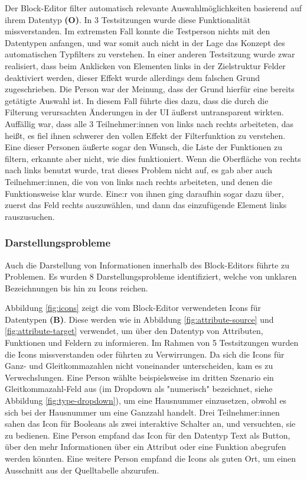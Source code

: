 Der Block-Editor filter automatisch relevante Auswahlmöglichkeiten basierend auf ihrem Datentyp \textbf{(O)}. In 3 Testsitzungen wurde diese Funktionalität missverstanden. Im extremsten Fall konnte die Testperson nichts mit den Datentypen anfangen, und war somit auch nicht in der Lage das Konzept des automatischen Typfilters zu verstehen. In einer anderen Testsitzung wurde zwar realisiert, dass beim Anklicken von Elementen links in der Zielstruktur Felder deaktiviert werden, dieser Effekt wurde allerdings dem falschen Grund zugeschrieben. Die Person war der Meinung, dass der Grund hierfür eine bereits getätigte Auswahl ist. In diesem Fall führte dies dazu, dass die durch die Filterung verursachten Änderungen in der UI äußerst untransparent wirkten. Auffällig war, dass alle 3 Teilnehmer:innen von links nach rechts arbeiteten, das heißt, es fiel ihnen schwerer den vollen Effekt der Filterfunktion zu verstehen. Eine dieser Personen äußerte sogar den Wunsch, die Liste der Funktionen zu filtern, erkannte aber nicht, wie dies funktioniert. Wenn die Oberfläche von rechts nach links benutzt wurde, trat dieses Problem nicht auf, es gab aber auch Teilnehmer:innen, die von von links nach rechts arbeiteten, und denen die Funktionsweise klar wurde. Eine:r von ihnen ging daraufhin sogar dazu über, zuerst das Feld rechts auszuwählen, und dann das einzufügende Element links rauszusuchen.

\subsubsection{Darstellungsprobleme}

Auch die Darstellung von Informationen innerhalb des Block-Editors führte zu Problemen. Es wurden 8 Darstellungsprobleme identifiziert, welche von unklaren Bezeichnungen bis hin zu Icons reichen.

Abbildung \ref{fig:icons} zeigt die vom Block-Editor verwendeten Icons für Datentypen \textbf{(B)}. Diese werden wie in Abbildung \ref{fig:attribute-source} und \ref{fig:attribute-target} verwendet, um über den Datentyp von Attributen, Funktionen und Feldern zu informieren. Im Rahmen von 5 Testsitzungen wurden die Icons missverstanden oder führten zu Verwirrungen. Da sich die Icons für Ganz- und Gleitkommazahlen nicht voneinander unterscheiden, kam es zu Verwechslungen. Eine Person wählte beispielsweise im dritten Szenario ein Gleitkommazahl-Feld aus (im Dropdown als "numerisch" bezeichnet, siehe Abbildung \ref{fig:type-dropdown}), um eine Hausnummer einzusetzen, obwohl es sich bei der Hausnummer um eine Ganzzahl handelt.  Drei Teilnehmer:innen sahen das Icon für Booleans als zwei interaktive Schalter an, und versuchten, sie zu bedienen. Eine Person empfand das Icon für den Datentyp Text als Button, über den mehr Informationen über ein Attribut oder eine Funktion abegrufen werden könnten. Eine weitere Person empfand die Icons als guten Ort, um einen Ausschnitt aus der Quelltabelle abzurufen.


